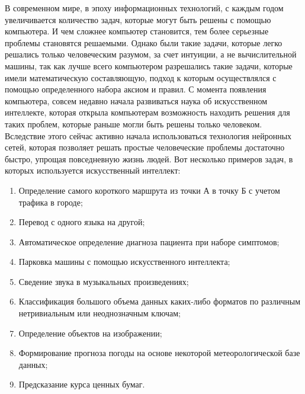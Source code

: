 \documentclass[bachelor, och, coursework]{SCWorks}
\begin{document}


\tableofcontents

\intro

    В современном мире, в эпоху информационных технологий, с каждым годом увеличивается количество задач, которые могут быть решены с помощью компьютера. И чем сложнее компьютер становится, тем более серьезные проблемы становятся решаемыми. Однако были такие задачи, которые легко решались только человеческим разумом, за счет интуиции, а не вычислительной машины, так как лучше всего компьютером разрешались такие задачи, которые имели математическую составляющую, подход к которым осуществлялся с помощью определенного набора аксиом и правил. С момента появления компьютера, совсем недавно начала развиваться наука об искусственном интеллекте, которая открыла компьютерам возможность находить решения для таких проблем, которые раньше могли быть решены только человеком. Вследствие этого сейчас активно начала использоваться технология нейронных сетей, которая позволяет решать простые человеческие проблемы достаточно быстро, упрощая повседневную жизнь людей. 
    Вот несколько примеров задач, в которых используется искусственный интеллект:
    
    \begin{enumerate}
        \item Определение самого короткого маршрута из точки А в точку Б с учетом трафика в городе;
        \item Перевод с одного языка на другой;
        \item Автоматическое определение диагноза пациента при наборе симптомов;
        \item Парковка машины с помощью искусственного интеллекта;
        \item Сведение звука в музыкальных произведениях;
        \item Классификация большого объема данных каких-либо форматов по различным нетривиальным или неоднозначным ключам;
        \item Определение объектов на изображении;
        \item Формирование прогноза погоды на основе некоторой метеорологической базе данных;
        \item Предсказание курса ценных бумаг.
    \end{enumerate}
\end{document}
